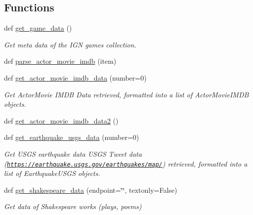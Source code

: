 \subsection*{Functions}
\begin{DoxyCompactItemize}
\item 
def \mbox{\hyperlink{namespacebridges_1_1data__src__dependent_1_1data__source_a31b64b8c7a42cdfca0a5f0ae3da187d2}{get\+\_\+game\+\_\+data}} ()
\begin{DoxyCompactList}\small\item\em Get meta data of the I\+GN games collection. \end{DoxyCompactList}\item 
def \mbox{\hyperlink{namespacebridges_1_1data__src__dependent_1_1data__source_adcd1eb0d5e4c80095232e808f34469ad}{parse\+\_\+actor\+\_\+movie\+\_\+imdb}} (item)
\item 
def \mbox{\hyperlink{namespacebridges_1_1data__src__dependent_1_1data__source_a5a685fd00b37b99d63e706289dad9063}{get\+\_\+actor\+\_\+movie\+\_\+imdb\+\_\+data}} (number=0)
\begin{DoxyCompactList}\small\item\em Get Actor\+Movie I\+M\+DB Data retrieved, formatted into a list of Actor\+Movie\+I\+M\+DB objects. \end{DoxyCompactList}\item 
def \mbox{\hyperlink{namespacebridges_1_1data__src__dependent_1_1data__source_a279aa1a757f4838f3d048651cb1a7d26}{get\+\_\+actor\+\_\+movie\+\_\+imdb\+\_\+data2}} ()
\item 
def \mbox{\hyperlink{namespacebridges_1_1data__src__dependent_1_1data__source_a0d2a8b28fa0fa79440112d02ca9cd7fc}{get\+\_\+earthquake\+\_\+usgs\+\_\+data}} (number=0)
\begin{DoxyCompactList}\small\item\em Get U\+S\+GS earthquake data U\+S\+GS Tweet data (\href{https://earthquake.usgs.gov/earthquakes/map/}{\tt https\+://earthquake.\+usgs.\+gov/earthquakes/map/}) retrieved, formatted into a list of Earthquake\+U\+S\+GS objects. \end{DoxyCompactList}\item 
def \mbox{\hyperlink{namespacebridges_1_1data__src__dependent_1_1data__source_a141593343ceef42e35072b3151a8b2db}{get\+\_\+shakespeare\+\_\+data}} (endpoint=\char`\"{}\char`\"{}, textonly=False)
\begin{DoxyCompactList}\small\item\em Get data of Shakespeare works (plays, poems) \end{DoxyCompactList}\item 

\end{DoxyCompactItemize}

